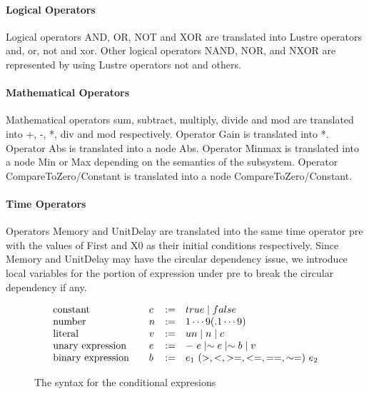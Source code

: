 \documentclass{article}
\begin{document}
\paragraph{Logical Operators} 
Logical operators AND, OR, NOT and XOR are translated into Lustre operators 
\textsf{and, or, not} and \textsf{xor}.
Other logical operators NAND, NOR, and NXOR are represented by using Lustre 
operators \textsf{not} and others.

\paragraph{Mathematical Operators} 
Mathematical operators sum, subtract, multiply, divide and mod are translated into 
\textsf{+}, \textsf{-}, \textsf{*}, \textsf{div} and \textsf{mod} respectively.
Operator Gain is translated into \textsf{*}. 
Operator Abs is translated into a node Abs. 
Operator Minmax is translated into a node Min or Max depending on the semantics of the subsystem. 
Operator CompareToZero/Constant is translated into a node CompareToZero/Constant.

\paragraph{Time Operators}
Operators Memory and UnitDelay are translated into the same time operator \textsf{pre} with the 
values of First and X0 as their initial conditions respectively.
Since Memory and UnitDelay may have the circular dependency issue, we introduce local variables for the 
portion of expression under \textsf{pre} to break the circular dependency if any. 

\begin{figure}[t]
\[
\begin{array}{l@{\qquad}llll}
 \text{constant} & c & := & 
true \mid false
 \\[0ex]
 \text{number} & n & := & 
 1 \cdots 9 (.1 \cdots 9)
 \\[0ex]
  \text{literal} & v & := & 
u n \mid n \mid c
 \\[0ex]
\text{unary expression} & e & := & 
-\ e \mid \sim e \mid \sim b \mid v
 \\[0ex]
 \text{binary expression} & b & := & 
e_1\ (>, <, >=, <=, ==, \sim=)\ e_2 
 \\[0ex]
\end{array}       
\]
\caption{The syntax for the conditional expresions}
\label{fig:grammar}
\end{figure}
\end{document}
